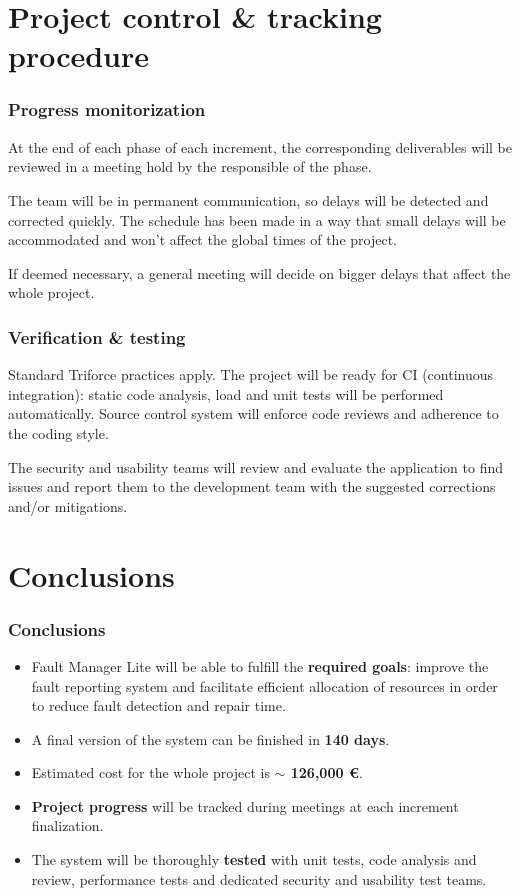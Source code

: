 \documentclass[10pt, compress,usetitleprogressbar,aspectratio=1610]{beamer}
\begin{document}
\section{Project control \& tracking procedure}

\begin{frame}
\frametitle{Progress monitorization}
At the end of each phase of each increment, the corresponding deliverables will be reviewed in a meeting hold by the responsible of the phase.

The team will be in permanent communication, so delays will be detected and corrected quickly. The schedule has been made in a way that small delays will be accommodated and won't affect the global times of the project.

If deemed necessary, a general meeting will decide on bigger delays that affect the whole project.
\end{frame}

\begin{frame}
\frametitle{Verification \& testing}
Standard Triforce practices apply. The project will be ready for CI (continuous integration): static code analysis, load and unit tests will be performed automatically. Source control system will enforce code reviews and adherence to the coding style.

The security and usability teams will review and evaluate the application to find issues and report them to the development team with the suggested corrections and/or mitigations.
\end{frame}

\section{Conclusions}

\begin{frame}
\frametitle{Conclusions}

\begin{itemize}
\item Fault Manager Lite will be able to fulfill the \textbf{required goals}: improve the fault reporting system and facilitate efficient allocation of resources in order to reduce fault detection and repair time.
\item A final version of the system can be finished in \textbf{140 days}.
\item Estimated cost for the whole project is \textbf{$\sim$ 126,000 \euro}.
\item \textbf{Project progress} will be tracked during meetings at each increment finalization.
\item The system will be thoroughly \textbf{tested} with unit tests, code analysis and review, performance tests and dedicated security and usability test teams.
\end{itemize}

\end{frame}

\end{document}

